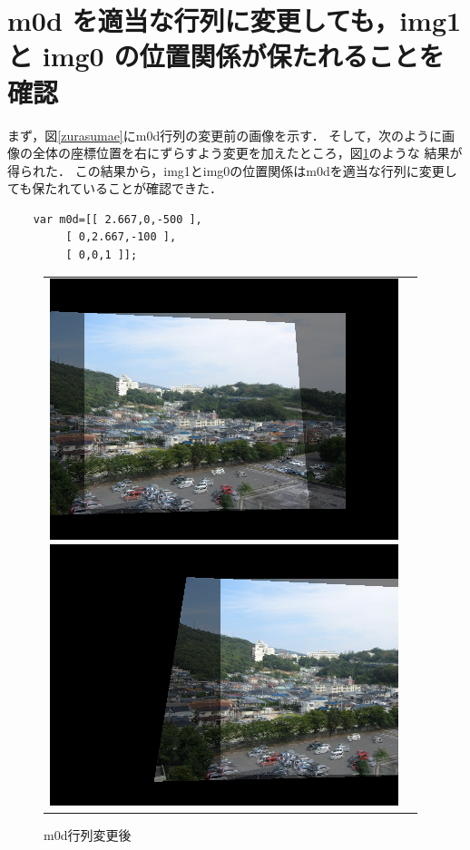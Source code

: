 \documentclass[11pt]{jarticle}
\begin{document}
\section{m0d を適当な行列に変更しても，img1 と img0 の位置関係が保たれることを確認}
まず，図\ref{zurasumae}にm0d行列の変更前の画像を示す．
そして，次のように画像の全体の座標位置を右にずらすよう変更を加えたところ，図\ref{zurasu.png}のような
結果が得られた．
この結果から，img1とimg0の位置関係はm0dを適当な行列に変更しても保たれていることが確認できた．
\begin{verbatim}
    var m0d=[[ 2.667,0,-500 ],
         [ 0,2.667,-100 ],
         [ 0,0,1 ]];
\end{verbatim}
\begin{figure}[htbp]
    \begin{tabular}{cc}
        \begin{minipage}{0.5\hsize}
            \begin{center}
                \includegraphics[scale=.5]{henkoumae.png}
                \caption{m0d行列変更前}
                \label{zurasumae}
            \end{center}
        \end{minipage}
        \begin{minipage}{0.5\hsize}
            \begin{center}
                \includegraphics[scale=.5]{zurasu.png}
                \caption{m0d行列変更後}
                \label{zurasu.png}
            \end{center}
        \end{minipage}
    \end{tabular}
\end{figure}
\end{document}
